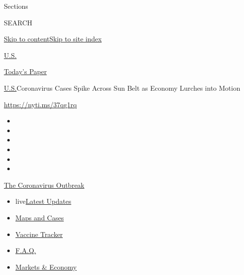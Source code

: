 Sections

SEARCH

\protect\hyperlink{site-content}{Skip to
content}\protect\hyperlink{site-index}{Skip to site index}

\href{https://www.nytimes.com/section/us}{U.S.}

\href{https://myaccount.nytimes.com/auth/login?response_type=cookie\&client_id=vi}{}

\href{https://www.nytimes.com/section/todayspaper}{Today's Paper}

\href{/section/us}{U.S.}\textbar{}Coronavirus Cases Spike Across Sun
Belt as Economy Lurches into Motion

\href{https://nyti.ms/37qg1rq}{https://nyti.ms/37qg1rq}

\begin{itemize}
\item
\item
\item
\item
\item
\item
\end{itemize}

\href{https://www.nytimes.com/news-event/coronavirus?action=click\&pgtype=Article\&state=default\&region=TOP_BANNER\&context=storylines_menu}{The
Coronavirus Outbreak}

\begin{itemize}
\tightlist
\item
  live\href{https://www.nytimes.com/2020/08/08/world/coronavirus-updates.html?action=click\&pgtype=Article\&state=default\&region=TOP_BANNER\&context=storylines_menu}{Latest
  Updates}
\item
  \href{https://www.nytimes.com/interactive/2020/us/coronavirus-us-cases.html?action=click\&pgtype=Article\&state=default\&region=TOP_BANNER\&context=storylines_menu}{Maps
  and Cases}
\item
  \href{https://www.nytimes.com/interactive/2020/science/coronavirus-vaccine-tracker.html?action=click\&pgtype=Article\&state=default\&region=TOP_BANNER\&context=storylines_menu}{Vaccine
  Tracker}
\item
  \href{https://www.nytimes.com/interactive/2020/world/coronavirus-tips-advice.html?action=click\&pgtype=Article\&state=default\&region=TOP_BANNER\&context=storylines_menu}{F.A.Q.}
\item
  \href{https://www.nytimes.com/live/2020/08/07/business/stock-market-today-coronavirus?action=click\&pgtype=Article\&state=default\&region=TOP_BANNER\&context=storylines_menu}{Markets
  \& Economy}
\end{itemize}

